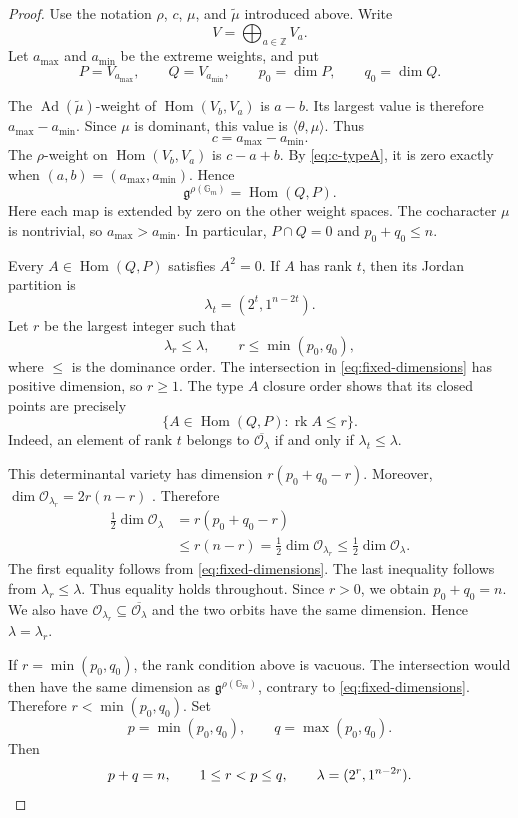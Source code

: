 \documentclass[10pt,a4paper]{amsart}
\DeclareMathOperator{\rk}{rk}
\newcommand{\Gm}{\mathbb G_m}
\begin{document}
\begin{proof}
Use the notation $\rho$, $c$, $\mu$, and $\widetilde{\mu}$ introduced
above. Write
\[
V=\bigoplus_{a\in\mathbb Z}V_a.
\]
Let $a_{\max}$ and $a_{\min}$ be the extreme weights, and put
\[
P=V_{a_{\max}},\qquad Q=V_{a_{\min}},\qquad
p_0=\dim P,\qquad q_0=\dim Q.
\]

The $\operatorname{Ad}(\widetilde{\mu})$-weight of
$\operatorname{Hom}(V_b,V_a)$ is $a-b$. Its largest value is therefore
$a_{\max}-a_{\min}$. Since $\mu$ is dominant, this value is
$\langle\theta,\mu\rangle$. Thus
\begin{equation}\label{eq:c-typeA}
c=a_{\max}-a_{\min}.
\end{equation}
The $\rho$-weight on $\operatorname{Hom}(V_b,V_a)$ is $c-a+b$.
By \eqref{eq:c-typeA}, it is zero exactly when
$(a,b)=(a_{\max},a_{\min})$. Hence
\[
\mathfrak g^{\rho(\Gm)}=\operatorname{Hom}(Q,P).
\]
Here each map is extended by zero on the other weight spaces. The
cocharacter $\mu$ is nontrivial, so $a_{\max}>a_{\min}$. In
particular, $P\cap Q=0$ and $p_0+q_0\leq n$.

Every $A\in\operatorname{Hom}(Q,P)$ satisfies $A^2=0$. If $A$ has
rank $t$, then its Jordan partition is
\[
\lambda_t=(2^t,1^{n-2t}).
\]
Let $r$ be the largest integer such that
\[
\lambda_r\leq\lambda,\qquad r\leq\min(p_0,q_0),
\]
where $\leq$ is the dominance order. The intersection in
\eqref{eq:fixed-dimensions} has positive dimension, so $r\geq1$.
The type $A$ closure order \cite{KP79} shows that its closed points are
precisely
\[
\{A\in\operatorname{Hom}(Q,P):\rk A\leq r\}.
\]
Indeed, an element of rank $t$ belongs to
$\overline{\mathcal O_\lambda}$ if and only if
$\lambda_t\leq\lambda$.

This determinantal variety has dimension $r(p_0+q_0-r)$. Moreover,
$\dim\mathcal O_{\lambda_r}=2r(n-r)$ \cite{KP79}. Therefore
\[
\begin{aligned}
\frac12\dim\mathcal O_\lambda
&=r(p_0+q_0-r)\\
&\leq r(n-r)
=\frac12\dim\mathcal O_{\lambda_r}
\leq\frac12\dim\mathcal O_\lambda.
\end{aligned}
\]
The first equality follows from \eqref{eq:fixed-dimensions}. The last
inequality follows from $\lambda_r\leq\lambda$. Thus equality holds
throughout. Since $r>0$, we obtain $p_0+q_0=n$. We also have
$\mathcal O_{\lambda_r}\subseteq\overline{\mathcal O_\lambda}$ and
the two orbits have the same dimension. Hence $\lambda=\lambda_r$.

If $r=\min(p_0,q_0)$, the rank condition above is vacuous. The
intersection would then have the same dimension as
$\mathfrak g^{\rho(\Gm)}$, contrary to
\eqref{eq:fixed-dimensions}. Therefore $r<\min(p_0,q_0)$. Set
\[
p=\min(p_0,q_0),\qquad q=\max(p_0,q_0).
\]
Then
\[
p+q=n,\qquad 1\leq r<p\leq q,\qquad
\lambda=(2^r,1^{n-2r}).\qedhere
\]
\end{proof}
\end{document}
